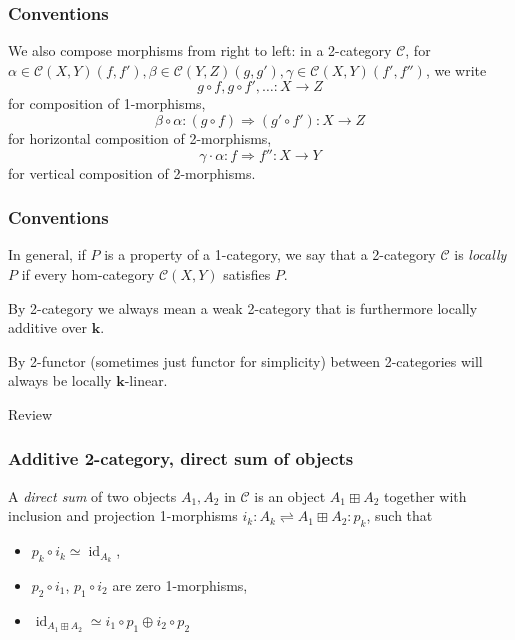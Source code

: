 \documentclass{beamer}
\newcommand{\kk}{{\mathbf{k}}}
\DeclareMathOperator{\id}{id}
\newcommand{\cC}{{\mathcal{C}}}
\begin{document}
\begin{frame}
\frametitle{Conventions}
We also compose morphisms from right to left:
in a 2-category $\cC$,
for $\alpha \in \cC(X,Y)(f,f'),
\beta \in \cC(Y,Z)(g,g'),
\gamma \in \cC(X,Y)(f',f'')$,
we write
\[
g \circ f, g \circ f', \ldots : X \to Z
\]
for composition of 1-morphisms,
\[
\beta \circ \alpha: (g \circ f) \Rightarrow (g' \circ f'):
	X \to Z
\]
for horizontal composition of 2-morphisms,
\[
\gamma \cdot \alpha: f \Rightarrow f'' : X \to Y
\]
for vertical composition of 2-morphisms.

\end{frame}


\begin{frame}
\frametitle{Conventions}
In general, if $P$ is a property of a 1-category,
we say that a 2-category $\cC$ is \emph{locally $P$}
if every hom-category $\cC(X,Y)$ satisfies $P$.

\pause

By 2-category we always mean a weak 2-category
that is furthermore locally additive over $\kk$.

By 2-functor (sometimes just functor for simplicity)
between 2-categories will always be locally $\kk$-linear.

\end{frame}

\begin{frame}

\begin{center}
\Huge Review
\end{center}
\end{frame}

\begin{frame}
\frametitle{Additive 2-category, direct sum of objects}

\pause

\begin{definition}
A \emph{direct sum} of two objects $A_1,A_2$ in $\cC$
is an object $A_1 \boxplus A_2$ together with
inclusion and projection 1-morphisms
$i_k : A_k \rightleftharpoons A_1 \boxplus A_2 : p_k$,
such that
\begin{itemize}
\item $p_k \circ i_k \simeq \id_{A_k}$,
\item $p_2 \circ i_1$, $p_1 \circ i_2$ are zero 1-morphisms,
\item $\id_{A_1 \boxplus A_2} \simeq
	i_1 \circ p_1 \oplus i_2 \circ p_2$
\end{itemize}
\end{definition}


\end{frame}
\end{document}
